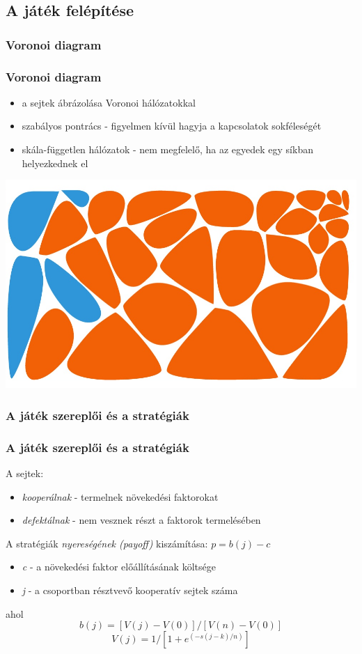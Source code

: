 \subsection{A játék felépítése}
\subsubsection{Voronoi diagram}
\begin{frame}
	\frametitle{Voronoi diagram}
	\begin{block}{}
		\begin{itemize}
			\item a sejtek ábrázolása Voronoi hálózatokkal
			\item szabályos pontrács - figyelmen kívül hagyja a kapcsolatok sokféleségét\cite{archetti2016cooperation}
			\item skála-független hálózatok - nem megfelelő, ha az egyedek egy síkban helyezkednek el\cite{archetti2016cooperation}
		\end{itemize}
	\end{block}
	
	\centering
	\includegraphics[width=0.5\linewidth]{images/Voronoi}
\end{frame}

\subsubsection{A játék szereplői és a stratégiák}
\begin{frame}
	\frametitle{A játék szereplői és a stratégiák}
	A sejtek:
	\begin{itemize}
		\item \textit{kooperálnak} - termelnek növekedési faktorokat
		\item \textit{defektálnak} - nem vesznek részt a faktorok termelésében
	\end{itemize}
	A stratégiák \textit{nyereségének (payoff)} kiszámítása: \(p = b(j) - c\)
	\begin{itemize}
		\item \textit{c} - a növekedési faktor előállításának költsége
		\item \textit{j} - a csoportban résztvevő kooperatív sejtek száma
	\end{itemize}
	ahol 
	\begin{equation}
		b(j) = [V(j) - V(0)]/[V(n) - V(0)]
	\end{equation}
	\begin{equation}
		\label{eq:payoffGradient}
		V(j) = 1/[1 + e^{(-s(j-k)/n)}]
	\end{equation}
\end{frame}

